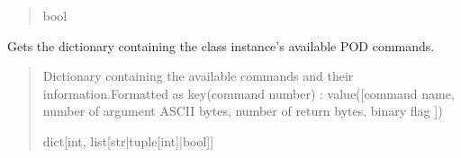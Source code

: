 \documentclass[letterpaper,10pt,english]{sphinxmanual}
\begin{document}
\begin{fulllineitems}
\begin{fulllineitems}
\begin{quote}
\begin{description}
\sphinxAtStartPar
bool

\end{description}\end{quote}

\end{fulllineitems}


\begin{fulllineitems}
\label{\detokenize{Morelia.Devices:Morelia.Devices.BasicPodProtocol.Pod.GetDeviceCommands}}
\pysigstartsignatures
{}
\pysigstopsignatures
\sphinxAtStartPar
Gets the dictionary containing the class instance’s available POD commands.
\begin{quote}\begin{description}
\sphinxAtStartPar
Dictionary containing the available commands and their                 information.Formatted as key(command number) : value({[}command name, number of argument                 ASCII bytes, number of return bytes, binary flag {]})

\sphinxAtStartPar
dict{[}int, list{[}str|tuple{[}int{]}|bool{]}{]}

\end{description}\end{quote}

\end{fulllineitems}



\end{fulllineitems}
\end{document}
